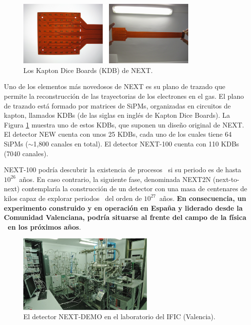 \begin{figure}
\centering
\includegraphics[width=0.8\textwidth]{img/KDB.png}
\caption{\small Los Kapton Dice Boards (KDB) de NEXT.} \label{fig.KDB}
\end{figure} 


Uno de los elementos más novedosos de NEXT es su plano de trazado que permite la reconstrucción de las trayectorias de los electrones en el gas. El plano de trazado está formado por matrices de SiPMs, organizadas en circuitos de kapton, llamados KDBs (de las siglas en inglés de Kapton Dice Boards). La Figura \ref{fig.KDB} muestra uno de estos KDBs, que suponen un diseño original de NEXT. El detector NEW cuenta con unos 25 KDBs, cada uno de los cuales tiene 64 SiPMs ($\sim$1,800 canales en total). El detector NEXT-100 cuenta con 110 KDBs  (7040 canales).  

NEXT-100 podría descubrir la existencia de procesos \bbonu\ si su periodo es de hasta $10^{26}$~años. En caso contrario, la siguiente fase, denominada NEXT2N (next-to-next) contemplaría la construcción de un detector con una masa de centenares de kilos capaz de explorar periodos \Tonu\ del orden de $10^{27}$~años. {\bf En consecuencia, un experimento construido y en operación en España y liderado desde la Comunidad Valenciana, podría situarse al frente del campo de la física \bbonu\ en los próximos años}.
 
 
\begin{figure}
\centering
\includegraphics[width=0.6\textwidth]{img/DemoSetup.png}
\caption{\small El detector NEXT-DEMO en el laboratorio del IFIC (Valencia).} \label{fig.DEMO}
\end{figure}

